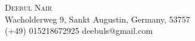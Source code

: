 \documentclass{article}
\newcommand{\contact}[3]{
\vspace*{5pt}
\begin{center}
{\Huge \scshape {#1}}\\
\vspace{3pt}
#2 
\vspace{2pt}
#3
\end{center}
\vspace*{-8pt}
}
\newcommand{\header}[1]{{
\hspace*{-15pt}\vspace*{6pt} \textsc{#1}} \vspace*{-6pt} 
\lineunder
}
\newcommand{\lineunder}{
\vspace*{-8pt} \\ \hspace*{-18pt} 
\hrulefill \\
}
\newcommand{\content}{
\vspace*{2pt}%
}
\renewcommand{\labelitemi}{
	\raisebox{0.3ex}{\tiny\textbullet}
}
\begin{document}
\small
\smallskip
\vspace*{-44pt}

\contact{Deebul Nair}
{Wacholderweg 9, Sankt Augustin, Germany, 53757\\}
{(+49) 015218672925 \labelitemi deebuls@gmail.com}
\vspace{15pt}

\vspace*{4pt}%
\end{document}
